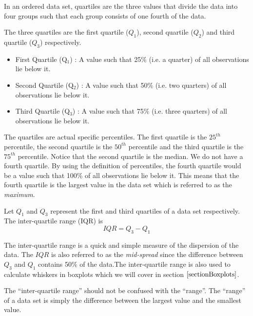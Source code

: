 \begin{definition}[Quartile]	
In an ordered data set, quartiles are the three values that divide the data into four groups such that each group consists of one fourth of the data.
\end{definition}

The three quartiles are the first quartile ($Q_{1}$), second quartile ($Q_{2}$) and 
third quartile ($Q_{3}$) respectively.

\begin{itemize}
\item	First Quartile (Q$_{1}$)	:	A value such that 25\% (i.e. a quarter) of all observations lie below it.
\item	Second Quartile (Q$_{2}$)	:	A value such that 50\% (i.e. two quarters) of all observations lie below it.
\item	Third Quartile (Q$_{3}$)	:	A value such that 75\% (i.e. three quarters) of all observations lie below it.
\end{itemize}

The quartiles are actual specific percentiles. The first quartile is the $25^{th}$ percentile, the second quartile is the $50^{th}$ percentile and the third quartile is the $75^{th}$ percentile. Notice that the second quartile is the median. We do not have a fourth quartile. By using the definition of percentiles, the fourth quartile would be a value such that 100\% of all observations lie below it. This means that the fourth quartile is the largest value in the data set which is referred to as the \textit{maximum}.

\begin{definition}	
Let $Q_{1}$ and $Q_{3}$ represent the first and third quartiles of a data set respectively.
The inter-quartile range (IQR) is
	\begin{equation}
	IQR = Q_{3} - Q_{1}
	\end{equation}
\end{definition}

The inter-quartile range is a quick and simple measure of the dispersion of the data. The $IQR$ is also referred to as the \textit{mid-spread} since the difference between $Q_{3}$ and $Q_{1}$ contains 50\% of the data.The inter-quartile range is also used to calculate whiskers in boxplots which we will cover in section $\ref{sectionBoxplots}$.

\begin{nt}
The ``inter-quartile range'' should not be confused with the ``range''. The ``range'' of a data set is simply the difference between the largest value
and the smallest value.
\end{nt}


